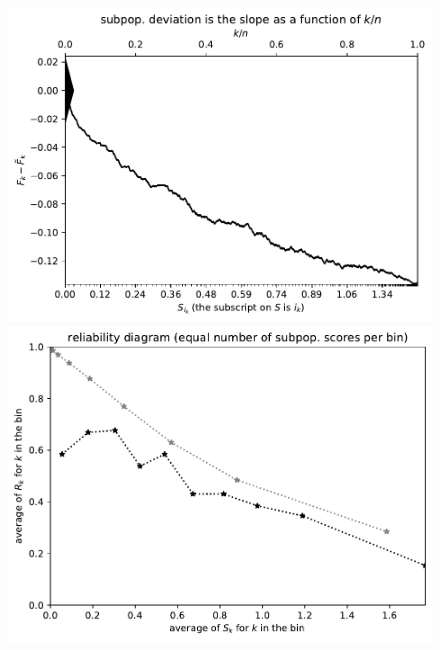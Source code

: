\documentclass{article}
\begin{document}
\begin{figure}
\begin{centering}

\parbox{\imsize}{\includegraphics[width=\imsize]
       {./codes/unweighted/nll-1-60-night-snake-Hypsiglena-torquata}}
\quad\quad
\parbox{\imsize}{\includegraphics[width=\imsize]
       {./codes/unweighted/nll-1-60-night-snake-Hypsiglena-torquataequisamps10}}

\vspace{\vertsep}


\end{centering}
\end{figure}
\end{document}
